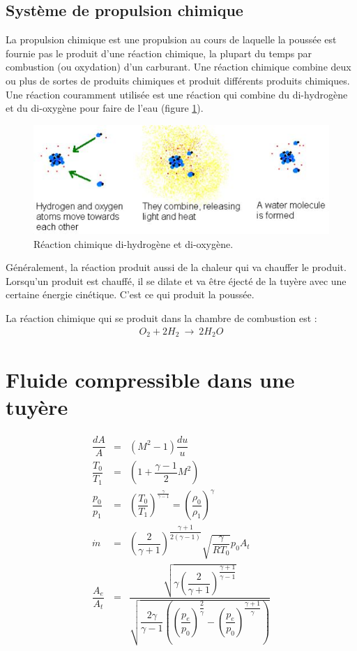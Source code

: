 \documentclass{report}
\begin{document}
\subsection{Système de propulsion chimique}

La propulsion chimique est une propulsion au cours de laquelle la poussée est fournie pas le produit d'une réaction chimique, la plupart du temps par combustion (ou oxydation) d'un carburant. Une réaction chimique combine deux ou plus de sortes de produits chimiques et produit différents produits chimiques. Une réaction couramment utilisée est une réaction qui combine du di-hydrogène et du di-oxygène pour faire de l'eau (figure \ref{43}).

\begin{figure}[h!]
    \centering
    \includegraphics[scale=0.7]{43.JPG}
    \caption{Réaction chimique di-hydrogène et di-oxygène.}
    \label{43}
\end{figure}

Généralement, la réaction produit aussi de la chaleur qui va chauffer le produit. Lorsqu'un produit est chauffé, il se dilate et va être éjecté de la tuyère avec une certaine énergie cinétique. C'est ce qui produit la poussée.

La réaction chimique qui se produit dans la chambre de combustion est :
\begin{eqnarray}
O_2+2H_2~\rightarrow~2H_2O
\end{eqnarray}

\section{Fluide compressible dans une tuyère}

\begin{eqnarray}
\dfrac{dA}{A} &= &(M^2-1)\dfrac{du}{u}\\
\dfrac{T_0}{T_1} &= &\left(1+\dfrac{\gamma-1}{2}M^2\right)\\
\dfrac{p_0}{p_1} &= &\left(\dfrac{T_0}{T_1}\right)^{\frac{\gamma}{\gamma-1}}=\left(\dfrac{\rho_0}{\rho_1}\right)^\gamma\\
\dot{m} &= &\left(\dfrac{2}{\gamma+1}\right)^{\dfrac{\gamma+1}{2(\gamma-1)}}\sqrt{\dfrac{\gamma}{RT_0}}p_0 A_t\\
\dfrac{A_e}{A_t} &= &\dfrac{\sqrt{\gamma\left(\dfrac{2}{\gamma+1}\right)^{\dfrac{\gamma+1}{\gamma-1}}}}{\sqrt{\dfrac{2\gamma}{\gamma-1}\left(\left(\dfrac{p_e}{p_0}\right)^{\dfrac{2}{\gamma}}-\left(\dfrac{p_e}{p_0}\right)^{\dfrac{\gamma+1}{\gamma}}\right)}}
\end{eqnarray}
\end{document}
